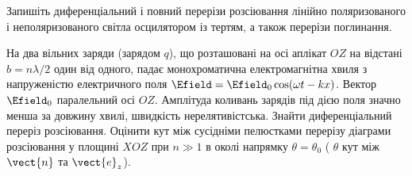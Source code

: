 \begin{problem}
Запишіть диференціальний і повний перерізи розсіювання лінійно поляризованого і неполяризованого світла осцилятором із
тертям, а також перерізи поглинання.
\end{problem}

\begin{problem}
На два вільних заряди (зарядом  $q$), що розташовані на осі аплікат $OZ$ на відстані  $b= n\lambda/2$ один від одного, падає монохроматична електромагнітна хвиля з напруженістю електричного поля $\Efield = \Efield_0\cos(\omega t - kx)$. Вектор $\Efield_0$  паралельний осі $OZ$. Амплітуда коливань зарядів під дією поля значно менша за довжину хвилі, швидкість нерелятивістська. Знайти диференціальний переріз розсіювання. Оцінити кут між сусідніми пелюстками  перерізу діаграми розсіювання у площині $XOZ$ при $n \gg 1$  в околі напрямку $\theta = \theta_0$  ( $\theta$ кут між  $\vect{n}$ та $\vect{e}_z$).
\end{problem}




